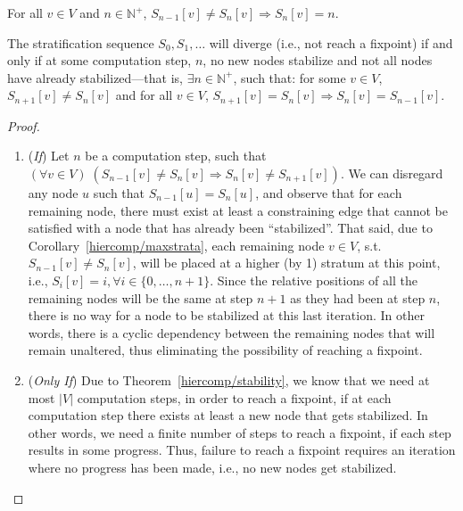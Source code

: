 \begin{corollary}\label{hiercomp/maxstrata}
  For all $v \in V$ and $n \in \mathbb{N}^+$, $S_{n-1}[v] \neq
  S_{n}[v] \Rightarrow S_{n}[v] = n$.
\end{corollary}

\begin{thm}\label{hiercomp/termination}
  The stratification sequence $S_0, S_1,\ldots$ will diverge (i.e.,
  not reach a
  fixpoint) if and only if at some computation step, $n$, no new nodes stabilize
  and not all nodes have
  already stabilized---that is, $\exists n
  \in \mathbb{N}^+$, such that: for some $v \in V$, $S_{n+1}[v] \neq
  S_{n}[v]$ and for all $v \in V$, $S_{n+1}[v] = S_{n}[v] \Rightarrow
  S_{n}[v] = S_{n-1}[v]$.
\end{thm}

\begin{proof}\hspace*{\fill}
  \begin{enumerate}
  \item (\emph{If}) Let $n$ be a computation step, such
    that $(\forall v \in V) \; (S_{n-1}[v] \neq S_{n}[v] \Rightarrow
    S_{n}[v] \neq S_{n+1}[v])$. We can disregard any node $u$ such
    that $S_{n-1}[u] = S_{n}[u]$, and observe that for each remaining
    node, there must exist at least a constraining edge that cannot be
    satisfied with a node that has already been ``stabilized''. That
    said, due to Corollary~\ref{hiercomp/maxstrata}, each remaining node $v \in
    V$, s.t. $S_{n-1}[v] \neq S_{n}[v]$, will be placed at a higher (by 1)
    stratum at this point, i.e., $S_{i}[v] = i, \forall i \in
    \{0,\ldots{},n+1\}$. Since the relative positions of all the
    remaining nodes will be the same at step $n+1$ as they had been at
    step $n$, there is no way for a node to be stabilized at this last
    iteration. In other words, there is a cyclic dependency between
    the remaining nodes that will remain unaltered, thus eliminating
    the possibility of reaching a fixpoint.
  \item (\emph{Only If}) Due to Theorem~\ref{hiercomp/stability},
    we know that we need at most $|V|$ computation steps, in order to
    reach a fixpoint, if at each computation step there exists at
    least a new node that gets stabilized. In other words, we need a
    finite number of steps to reach a fixpoint, if each step results
    in some progress. Thus, failure to reach a fixpoint requires an
    iteration where no progress has been made, i.e., no new nodes get
    stabilized.
  \end{enumerate}
\end{proof}

